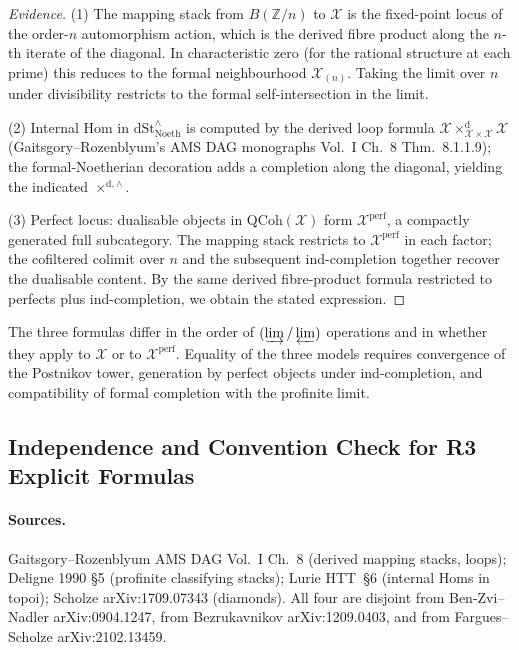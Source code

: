 \begin{proof}[Evidence]
(1) The mapping stack from \(B(\mathbb{Z}/n)\) to \(\mathcal{X}\) is
the fixed-point locus of the order-\(n\) automorphism action, which
is the derived fibre product along the \(n\)-th iterate of the
diagonal. In characteristic zero (for the rational structure at
each prime) this reduces to the formal neighbourhood
\(\mathcal{X}_{(n)}\). Taking the limit over \(n\) under divisibility
restricts to the formal self-intersection in the limit.

(2) Internal Hom in \(\mathrm{dSt}^{\wedge}_{\mathrm{Noeth}}\) is
computed by the derived loop formula
\(\mathcal{X}\times^{\mathrm{d}}_{\mathcal{X}\times\mathcal{X}}\mathcal{X}\)
(Gaitsgory--Rozenblyum's AMS DAG monographs Vol.~I Ch.~8
Thm.~8.1.1.9); the formal-Noetherian decoration adds a
completion along the diagonal, yielding the indicated
\(\times^{\mathrm{d},\wedge}\).

(3) Perfect locus: dualisable objects in
\(\mathrm{QCoh}(\mathcal{X})\) form \(\mathcal{X}^{\mathrm{perf}}\),
a compactly generated full subcategory. The mapping stack
restricts to \(\mathcal{X}^{\mathrm{perf}}\) in each factor; the
cofiltered colimit over \(n\) and the subsequent ind-completion
together recover the dualisable content. By the same derived
fibre-product formula restricted to perfects plus ind-completion,
we obtain the stated expression.
\end{proof}

\begin{remark}
\label{v4-arith:bzn-rcompletion:rem:three-formulas}
The three formulas differ in the order of \((\varinjlim/\varprojlim)\)
operations and in whether they apply to \(\mathcal{X}\) or to
\(\mathcal{X}^{\mathrm{perf}}\). Equality of the three models
requires convergence of the Postnikov tower, generation by perfect
objects under ind-completion, and compatibility of formal completion
with the profinite limit.
\end{remark}

\subsection{Independence and Convention Check for R3 Explicit Formulas}

\paragraph{Sources.} Gaitsgory--Rozenblyum
AMS DAG Vol.~I Ch.~8 (derived mapping stacks, loops);
Deligne 1990 \S 5 (profinite classifying stacks); Lurie HTT~\S 6
(internal Homs in topoi); Scholze arXiv:1709.07343 (diamonds).
All four are disjoint from Ben-Zvi--Nadler arXiv:0904.1247, from
Bezrukavnikov arXiv:1209.0403, and from Fargues--Scholze
arXiv:2102.13459.

